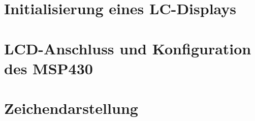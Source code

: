 \documentclass[a4paper, 12pt]{article}
\begin{document}
\section{Initialisierung eines LC-Displays}
\section{LCD-Anschluss und Konfiguration des MSP430}
\section{Zeichendarstellung}
  
 
\end{document}
